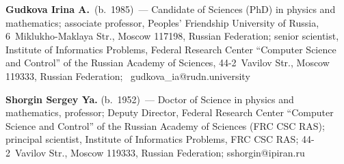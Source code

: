 \vspace*{-24pt}

\Contr

\noindent
\textbf{Gudkova Irina A.}\ (b.\ 1985)~--- Candidate of Sciences (PhD) in physics and 
mathematics; associate professor, Peoples' Friendship University of Russia,  
6~Miklukho-Maklaya Str., Moscow 117198, Russian Federation; senior scientist, Institute 
of Informatics Problems, Federal Research Center ``Computer Science and Control'' of the 
Russian Academy of Sciences, 44-2~Vavilov Str., Moscow 119333, Russian Federation; 
\mbox{ gudkova\_ia@rudn.university }


\noindent
\textbf{Shorgin Sergey Ya.} (b.\ 1952)~--- Doctor of Science in physics and mathematics, professor; Deputy Director, Federal Research Center 
``Computer Science and Control'' of the Russian Academy of Sciences (FRC CSC RAS); principal scientist, Institute of Informatics Problems, FRC 
CSC RAS; 44-2~Vavilov Str., Moscow 119333, Russian Federation; \mbox{sshorgin@ipiran.ru}

\label{end\stat}


\renewcommand{\bibname}{\protect\rm Литература} 